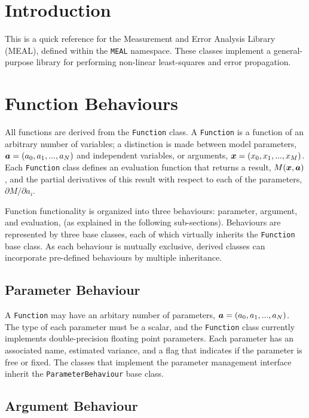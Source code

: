 \documentclass[12pt]{article}
\newcommand{\mbf}[1]{\mbox{\boldmath $#1$}}
\begin{document}
\section{Introduction}

This is a quick reference for the Measurement and Error Analysis
Library (MEAL), defined within the {\tt MEAL} namespace.  These
classes implement a general-purpose library for performing non-linear
least-squares and error propagation.

\section{Function Behaviours}

All functions are derived from the {\tt Function} class.  A {\tt Function}
is a function of an arbitrary number of variables; a distinction is
made between model parameters, ${\mbf a}=(a_0, a_1, ... , a_N)$ and
independent variables, or arguments, ${\mbf x}=(x_0, x_1, ... , x_M)$.
Each {\tt Function} class defines an evaluation function that returns a
result, $M({\mbf x},{\mbf a})$, and the partial derivatives of this
result with respect to each of the parameters, $\partial M/\partial
a_i$.

Function functionality is organized into three behaviours: parameter,
argument, and evaluation, (as explained in the following
sub-sections).  Behaviours are represented by three base classes, each
of which virtually inherits the {\tt Function} base class.  As each
behaviour is mutually exclusive, derived classes can incorporate
pre-defined behaviours by multiple inheritance.

\subsection{Parameter Behaviour}

A {\tt Function} may have an arbitary number of parameters,
$\mbf{a}=(a_0, a_1, ... , a_N)$.  The type of each parameter must be a
scalar, and the {\tt Function} class currently implements
double-precision floating point parameters.  Each parameter has an
associated name, estimated variance, and a flag that indicates if the
parameter is free or fixed.  The classes that implement the parameter
management interface inherit the {\tt ParameterBehaviour} base class.

\subsection{Argument Behaviour}
\end{document}
